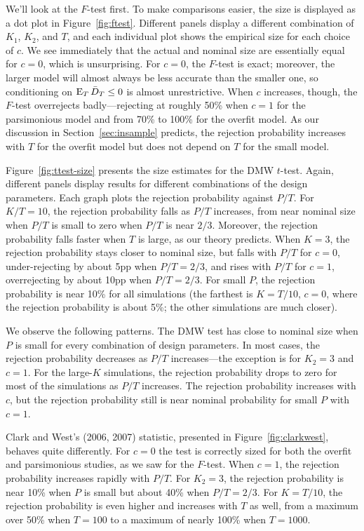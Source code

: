 \documentclass[11pt]{article}
\begin{document}
We'll look at the $F$-test first.  To make comparisons easier, the size
is displayed as a dot plot in Figure~\ref{fig:ftest}.  Different
panels display a different combination of $K_1$, $K_2$, and $T$, and
each individual plot shows the empirical size for each choice of $c$.
We see immediately that the actual and nominal size are essentially
equal for $c = 0$, which is unsurprising.  For $c = 0$, the $F$-test is
exact; moreover, the larger model will almost always be less accurate
than the smaller one, so conditioning on $\operatorname{E}_T \bar{D}_{T} \leq 0$ is
almost unrestrictive.  When $c$ increases, though, the $F$-test
overrejects badly---rejecting at roughly 50\% when $c = 1$ for the
parsimonious model and from 70\% to 100\% for the overfit model.  As
our discussion in Section~\ref{sec:insample} predicts, the rejection
probability increases with $T$ for the overfit model but does not
depend on $T$ for the small model.

Figure~\ref{fig:ttest-size} presents the size estimates for the DMW
$t$-test.  Again, different panels display results for different
combinations of the design parameters.  Each graph plots the rejection
probability against $P/T$.  For $K/T=10$, the rejection probability
falls as $P/T$ increases, from near nominal size when $P/T$ is small
to zero when $P/T$ is near $2/3$.  Moreover, the rejection probability
falls faster when $T$ is large, as our theory predicts.  When $K=3$,
the rejection probability stays closer to nominal size, but falls with
$P/T$ for $c=0$, under-rejecting by about 5pp when $P/T = 2/3$, and
rises with $P/T$ for $c=1$, overrejecting by about 10pp when
$P/T=2/3$.  For small $P$, the rejection probability is near 10\% for
all simulations (the farthest is $K=T/10$, $c=0$, where the rejection
probability is about 5\%; the other simulations are much closer).

We observe the following patterns.  The
DMW test has close to nominal size when $P$ is small for every
combination of design parameters.  In most cases, the rejection
probability decreases as $P/T$ increases---the exception is for $K_2 =
3$ and $c=1$.  For the large-$K$ simulations, the rejection
probability drops to zero for most of the simulations as $P/T$
increases.  The rejection probability increases with $c$, but the
rejection probability still is near nominal probability for small $P$
with $c=1$.

Clark and West's (2006, 2007) statistic, presented in
Figure~\ref{fig:clarkwest}, behaves quite differently.  For $c=0$ the
test is correctly sized for both the overfit and parsimonious studies,
as we saw for the $F$-test.  When $c=1$, the rejection probability
increases rapidly with $P/T$.  For $K_2=3$, the rejection probability
is near 10\% when $P$ is small but about 40\% when $P/T = 2/3$.  For
$K=T/10$, the rejection probability is even higher and increases with
$T$ as well, from a maximum over 50\% when $T=100$ to a maximum of
nearly 100\% when $T=1000$.
\end{document}
